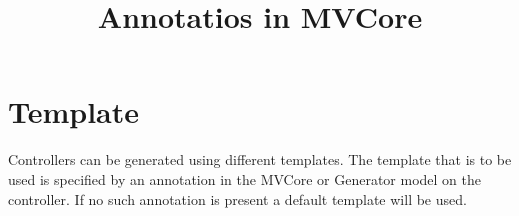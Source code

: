 \documentclass[10pt,a4paper]{article}
\title{Annotatios in MVCore}
\begin{document}
\maketitle

\section{Template}

Controllers can be generated using different templates. The template that is to be used is specified by an annotation in the MVCore or Generator model on the controller. If no such annotation is present a default template will be used.
\end{document}
